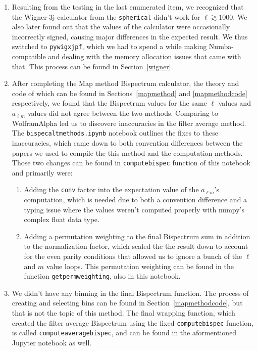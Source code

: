 \documentclass[11pt]{article}
\renewcommand{\_}[1]{\underline{ #1 }}
\newcommand{\us}{\textunderscore}
\begin{document}
{\begin{enumerate}
    \item Resulting from the testing in the last enumerated item, we recognized that the Wigner-3j calculator from the \texttt{spherical} didn't work for $\ell \gtrsim 1000$. We also later found out that the values of the calculator were occasionally incorrectly signed, causing major differences in the expected result. We thus switched to \texttt{pywigxjpf}, which we had to spend a while making Numba-compatible and dealing with the memory allocation issues that came with that. This process can be found in Section~\ref{wigner}.
    \item After completing the Map method Bispectrum calculator, the theory and code of which can be found in Sections~\ref{mapmethod} and \ref{mapmethodcode} respectively, we found that the Bispectrum values for the same $\ell$ values and $a_{\ell m}$ values did not agree between the two methods. Comparing to WolframAlpha led us to discovere inaccuracies in the filter average method. The \texttt{bispec\us alt\us methods.ipynb} notebook outlines the fixes to these inaccuracies, which came down to both convention differences between the papers we used to compile the this method and the computation methods. Those two changes can be found in \texttt{compute\us bispec} function of this notebook and primarily were:
    \begin{enumerate}
        \item Adding the \texttt{conv} factor into the expectation value of the $a_{\ell m}$'s computation, which is needed due to both a convention difference and a typing issue where the values weren't computed properly with numpy's complex float data type.
        \item Adding a permutation weighting to the final Bispectrum sum in addition to the normalization factor, which scaled the the result down to account for the even parity conditions that allowed us to ignore a bunch of the $\ell$ and $m$ value loops. This permutation weighting can be found in the function \texttt{get\us perm\us weighting}, also in this notebook.
    \end{enumerate}
    \item We didn't have any binning in the final Bispectrum function. The process of creating and selecting bins can be found in Section~\ref{mapmethodcode}, but that is not the topic of this method. The final wrapping function, which created the filter average Bispectrum using the fixed \texttt{compute\us bispec} function, is called \texttt{compute\us average\us bispec}, and can be found in the aformentioned Jupyter notebook as well.
\end{enumerate}

}
\end{document}
